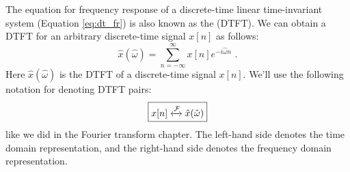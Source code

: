 The equation for frequency response of a discrete-time linear
time-invariant system (Equation \ref{eq:dt_fr}) is also known as the
\emph{} (DTFT).
We can obtain a DTFT for an arbitrary discrete-time signal $x[n]$ as
follows:
\begin{equation}
\boxed{
\hat{x}(\hat{\omega}) = \sum_{n=-\infty}^{\infty} x[n] e^{-i\hat{\omega} n}\,\,.
}
\label{eq:dtft_eq}
\end{equation}
Here $\hat{x}(\hat{\omega})$ is the DTFT of a discrete-time signal
$x[n]$. We'll use the following notation for denoting DTFT pairs:
\begin{equation}
\boxed{
x[n] \xleftrightarrow{\mathcal{F}} \hat{x}(\hat{\omega})
}
\end{equation}
like we did in the Fourier transform chapter. The left-hand side
denotes the time domain representation, and the right-hand side
denotes the frequency domain representation.

